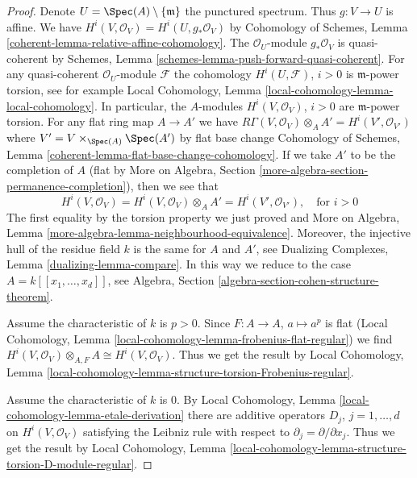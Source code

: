 \begin{proof}
Denote $U = \Spec(A) \setminus \{\mathfrak m\}$ the punctured spectrum.
Thus $g : V \to U$ is affine.
We have $H^i(V, \mathcal{O}_V) = H^i(U, g_*\mathcal{O}_V)$ by
Cohomology of Schemes, Lemma \ref{coherent-lemma-relative-affine-cohomology}.
The $\mathcal{O}_U$-module $g_*\mathcal{O}_V$ is quasi-coherent by
Schemes, Lemma \ref{schemes-lemma-push-forward-quasi-coherent}.
For any quasi-coherent $\mathcal{O}_U$-module $\mathcal{F}$
the cohomology $H^i(U, \mathcal{F})$, $i > 0$
is $\mathfrak m$-power torsion, see for example
Local Cohomology, Lemma \ref{local-cohomology-lemma-local-cohomology}.
In particular, the $A$-modules $H^i(V, \mathcal{O}_V)$, $i > 0$
are $\mathfrak m$-power torsion.
For any flat ring map $A \to A'$ we have
$R\Gamma(V, \mathcal{O}_V) \otimes_A A' = H^i(V', \mathcal{O}_{V'})$
where $V' = V \times_{\Spec(A)} \Spec(A')$ by flat base change
Cohomology of Schemes, Lemma \ref{coherent-lemma-flat-base-change-cohomology}.
If we take $A'$ to be the completion of $A$ (flat by
More on Algebra, Section \ref{more-algebra-section-permanence-completion}),
then we see that
$$
H^i(V, \mathcal{O}_V) = H^i(V, \mathcal{O}_V) \otimes_A A' =
H^i(V', \mathcal{O}_{V'}),\quad\text{for } i > 0
$$
The first equality by the torsion property we just proved and
More on Algebra, Lemma \ref{more-algebra-lemma-neighbourhood-equivalence}.
Moreover, the injective hull of the residue field $k$
is the same for $A$ and $A'$, see
Dualizing Complexes, Lemma \ref{dualizing-lemma-compare}.
In this way we reduce to the case $A = k[[x_1, \ldots, x_d]]$, see
Algebra, Section \ref{algebra-section-cohen-structure-theorem}.

\medskip\noindent
Assume the characteristic of $k$ is $p > 0$. Since $F : A \to A$,
$a \mapsto a^p$ is flat (Local Cohomology, Lemma
\ref{local-cohomology-lemma-frobenius-flat-regular})
we find $H^i(V, \mathcal{O}_V) \otimes_{A, F} A \cong H^i(V, \mathcal{O}_V)$.
Thus we get the result by
Local Cohomology, Lemma
\ref{local-cohomology-lemma-structure-torsion-Frobenius-regular}.

\medskip\noindent
Assume the characteristic of $k$ is $0$. By
Local Cohomology, Lemma \ref{local-cohomology-lemma-etale-derivation}
there are additive operators $D_j$, $j = 1, \ldots, d$ on
$H^i(V, \mathcal{O}_V)$ satisfying the Leibniz rule with
respect to $\partial_j = \partial/\partial x_j$.
Thus we get the result by
Local Cohomology,
Lemma \ref{local-cohomology-lemma-structure-torsion-D-module-regular}.
\end{proof}

